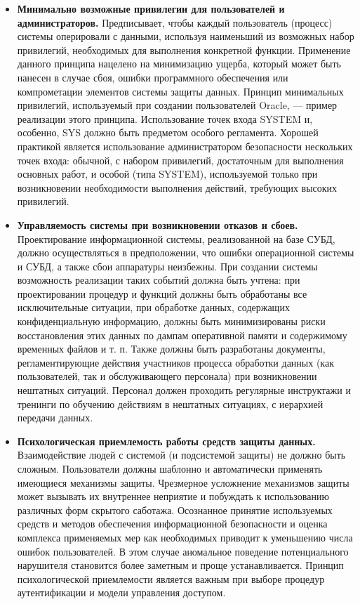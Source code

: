\begin{itemize}
    \item \textbf{Минимально возможные привилегии для пользователей и администраторов.}
        Предписывает, чтобы каждый пользователь (процесс) системы оперировали с данными, используя наименьший
        из возможных набор привилегий, необходимых для выполнения конкретной функции. Применение данного
        принципа нацелено на минимизацию ущерба, который может быть нанесен в случае сбоя, ошибки программного
        обеспечения или компрометации элементов системы защиты данных. Принцип минимальных привилегий,
        используемый при создании пользователей Oracle, — пример реализации этого принципа. Использование
        точек входа SYSTEM и, особенно, SYS должно быть предметом особого регламента. Хорошей практикой
        является использование администратором безопасности нескольких точек входа: обычной, с набором
        привилегий, достаточным для выполнения основных работ, и особой (типа SYSTEM), используемой только
        при возникновении необходимости выполнения действий, требующих высоких привилегий.

    \item \textbf{Управляемость системы при возникновении отказов и сбоев.}
        Проектирование информационной системы, реализованной на базе СУБД, должно осуществляться в предположении,
        что ошибки операционной системы и СУБД, а также сбои аппаратуры неизбежны. При создании системы
        возможность реализации таких событий должна быть учтена: при проектировании процедур и функций должны
        быть обработаны все исключительные ситуации, при обработке данных, содержащих конфиденциальную информацию,
        должны быть минимизированы риски восстановления этих данных по дампам оперативной памяти и содержимому
        временных файлов и т. п. Также должны быть разработаны документы, регламентирующие действия участников
        процесса обработки данных (как пользователей, так и обслуживающего персонала) при возникновении нештатных
        ситуаций. Персонал должен проходить регулярные инструктажи и тренинги по обучению действиям в нештатных
        ситуациях, с иерархией передачи данных.

    \item \textbf{Психологическая приемлемость работы средств защиты данных.}
        Взаимодействие людей с системой (и подсистемой защиты) не должно быть сложным. Пользователи должны
        шаблонно и автоматически применять имеющиеся механизмы защиты. Чрезмерное усложнение механизмов защиты
        может вызывать их внутреннее неприятие и побуждать к использованию различных форм скрытого саботажа.
        Осознанное принятие используемых средств и методов обеспечения информационной безопасности и оценка
        комплекса применяемых мер как необходимых приводит к уменьшению числа ошибок пользователей. В этом случае
        аномальное поведение потенциального нарушителя становится более заметным и проще устанавливается.
        Принцип психологической приемлемости является важным при выборе процедур аутентификации и модели
        управления доступом.
\end{itemize}


